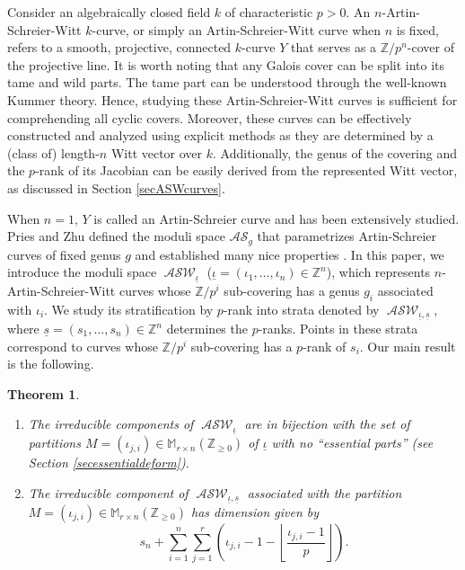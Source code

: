 \documentclass{compositio}
\newcommand{\mat}[1]{\todo[color=green]{MH: #1}}
\newtheorem{theorem}{Theorem}[section]
\theoremstyle{remark}
\theoremstyle{remark}
\DeclareMathOperator{\ASW}{\mathcal{ASW}}
\begin{document}
Consider an algebraically closed field $k$ of characteristic $p > 0$. An $n$-Artin-Schreier-Witt $k$-curve, or simply an Artin-Schreier-Witt curve when $n$ is fixed, refers to a smooth, projective, connected $k$-curve $Y$ that serves as a $\mathbb{Z}/p^n$-cover of the projective line. It is worth noting that any Galois cover can be split into its tame and wild parts. The tame part can be understood through the well-known Kummer theory. Hence, studying these Artin-Schreier-Witt curves is sufficient for comprehending all cyclic covers. Moreover, these curves can be effectively constructed and analyzed using explicit methods as they are determined by a (class of) length-$n$ Witt vector over $k$. Additionally, the genus of the covering and the $p$-rank of its Jacobian can be easily derived from the represented Witt vector, as discussed in Section \ref{secASWcurves}.

When $n=1$, $Y$ is called an Artin-Schreier curve and has been extensively studied. Pries and Zhu defined the moduli space $\mathcal{AS}_g$ that parametrizes Artin-Schreier curves of fixed genus $g$ and established many nice properties \cite{MR2985514}. In this paper, we introduce the moduli space $\ASW_{\underline{\iota}}$ ($\underline{\iota} = (\iota_1, \ldots, \iota_n) \in \mathbb{Z}^n$), which represents $n$-Artin-Schreier-Witt curves whose $\mathbb{Z}/p^i$ sub-covering has a genus $g_i$ associated with $\iota_i$. We study its stratification by $p$-rank into strata denoted by $\ASW_{\underline{\iota}, \underline{s}}$, where $\underline{s} = (s_1, \ldots, s_n) \in \mathbb{Z}^n$ determines the $p$-ranks. Points in these strata correspond to curves whose $\mathbb{Z}/p^i$ sub-covering has a $p$-rank of $s_i$. Our main result is the following.

\begin{theorem}
\begin{enumerate}
\item The irreducible components of $\ASW_{\underline{\iota}}$ are in bijection with the set of partitions $M=(\iota_{j,i}) \in \mathbb{M}_{r\times n}(\mathbb{Z}_{\ge 0})$ of $\underline{\iota}$ with no ``essential parts'' (see Section \ref{secessentialdeform}).
\item The irreducible component of $\ASW_{\underline{\iota}, \underline{s}}$ associated with the partition $M=(\iota_{j,i}) \in \mathbb{M}_{r\times n}(\mathbb{Z}_{\ge 0})$ has dimension given by
\begin{equation*}
s_n+\sum_{i=1}^n \sum_{j=1}^r \left( \iota_{j,i} -1 - \left\lfloor \frac{\iota_{j,i}-1}{p} \right\rfloor \right).
\end{equation*}
\end{enumerate}
\end{theorem}
\end{document}
